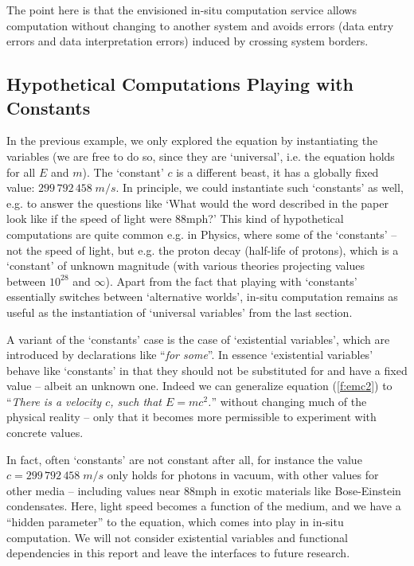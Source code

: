 The point here is that the envisioned in-situ computation service allows computation
without changing to another system and avoids errors (data entry errors and data
interpretation errors) induced by crossing system borders.

\subsection{Hypothetical Computations Playing with Constants}\label{sec:ex:hyp}

In the previous example, we only explored the equation by instantiating the variables (we
are free to do so, since they are `universal', i.e. the equation holds for all $E$ and
$m$). The `constant' $c$ is a different beast, it has a globally fixed value:
$299\, 792\, 458\;m/s$. In principle, we could instantiate such `constants' as well,
e.g. to answer the questions like `What would the word described in the paper look like
if the speed of light were $88 \text{mph}$?' This kind of hypothetical computations are
quite common e.g. in Physics, where some of the `constants' -- not the speed of light,
but e.g. the proton decay (half-life of protons), which is a `constant' of unknown
magnitude (with various theories projecting values between $10^{28}$ and $\infty$). Apart
from the fact that playing with `constants' essentially switches between `alternative
worlds', in-situ computation remains as useful as the instantiation of `universal
variables' from the last section.

A variant of the `constants' case is the case of `existential variables', which are
introduced by declarations like ``\emph{for some}''. In essence `existential variables'
behave like `constants' in that they should not be substituted for and have a fixed value
-- albeit an unknown one. Indeed we can generalize equation (\ref{f:emc2}) to
``\emph{There is a velocity $c$, such that $E=mc^2$.}'' without changing much of the
physical reality -- only that it becomes more permissible to experiment with concrete
values. 

In fact, often `constants' are not constant after all, for instance the value
$c=299\, 792\, 458\;m/s$ only holds for photons in vacuum, with other values for other
media -- including values near $88\text{mph}$ in exotic materials like Bose-Einstein
condensates. Here, light speed becomes a function of the medium, and we have a ``hidden
parameter'' to the equation, which comes into play in in-situ computation. We will not
consider existential variables and functional dependencies in this report and leave the
interfaces to future research.

